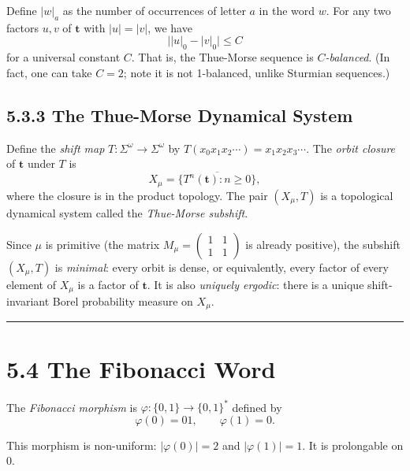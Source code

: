 \begin{theorem}[Balanced]
Define $|w|_a$ as the number of occurrences of letter $a$ in the word $w$. For any two factors $u, v$ of $\mathbf{t}$ with $|u| = |v|$, we have
\[
\big| |u|_0 - |v|_0 \big| \leq C
\]
for a universal constant $C$. That is, the Thue-Morse sequence is \textit{$C$-balanced}. (In fact, one can take $C = 2$; note it is not 1-balanced, unlike Sturmian sequences.)
\end{theorem}

\subsection{5.3.3 The Thue-Morse Dynamical System}

Define the \textit{shift map} $T: \Sigma^\omega \to \Sigma^\omega$ by $T(x_0 x_1 x_2 \cdots) = x_1 x_2 x_3 \cdots$. The \textit{orbit closure} of $\mathbf{t}$ under $T$ is
\[
X_\mu = \overline{\{ T^n(\mathbf{t}) : n \geq 0\} },
\]
where the closure is in the product topology. The pair $(X_\mu, T)$ is a topological dynamical system called the \textit{Thue-Morse subshift}.

Since $\mu$ is primitive (the matrix $M_\mu = \left(\begin{smallmatrix}1&1\\1&1\end{smallmatrix}\right)$ is already positive), the subshift $(X_\mu, T)$ is \textit{minimal}: every orbit is dense, or equivalently, every factor of every element of $X_\mu$ is a factor of $\mathbf{t}$. It is also \textit{uniquely ergodic}: there is a unique shift-invariant Borel probability measure on $X_\mu$.

\bigskip\hrule\bigskip

\section{5.4 The Fibonacci Word}

\begin{definition}
The \textit{Fibonacci morphism} is $\varphi: \{ 0,1\}  \to \{ 0,1\} ^*$ defined by
\[
\varphi(0) = 01, \qquad \varphi(1) = 0.
\]

This morphism is non-uniform: $|\varphi(0)| = 2$ and $|\varphi(1)| = 1$. It is prolongable on $0$.
\end{definition}

